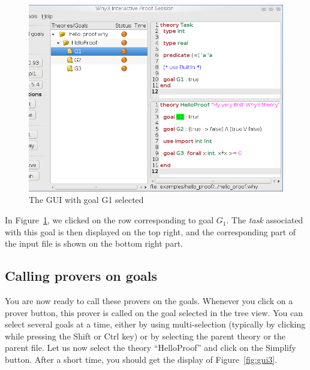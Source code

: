 \begin{figure}[tbp]
 \includegraphics[width=\textwidth]{gui-0-70-2.png}
  \caption{The GUI with goal G1 selected}
  \label{fig:gui2}
\end{figure}
In Figure~\ref{fig:gui2}, we clicked on the row corresponding to
goal $G_1$. The \emph{task} associated with this goal is then
displayed on the top right, and the corresponding part of the input
file is shown on the bottom right part.


\subsection{Calling provers on goals}

You are now ready to call these provers on the goals. Whenever you
click on a prover button, this prover is called on the goal selected
in the tree view. You can select several goals at a time, either
by using multi-selection (typically by clicking while pressing the
\textsf{Shift} or \textsf{Ctrl} key) or by selecting the parent theory
or the parent file. Let us now select the theory ``HelloProof'' and
click on the \textsf{Simplify} button. After a short time, you should
get the display of Figure~\ref{fig:gui3}.

